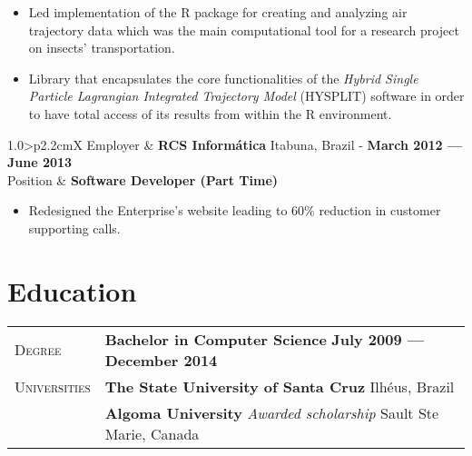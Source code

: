 \documentclass[9pt, a4paper, oneside, final]{scrartcl} %
\newcommand{\gray}{\rowcolor[gray]{.90}} %
\begin{document}
\begin{itemize}\itemsep1.0pt \parskip1.5pt 

\item Led implementation of the R package for creating and analyzing air trajectory data which was the main computational tool for a research project on insects' transportation.

\item Library that encapsulates the core functionalities of the \textit{Hybrid Single Particle Lagrangian Integrated Trajectory Model} (HYSPLIT) software in order to have total access of its results from within the R environment.

\end{itemize}

\begin{center}
\begin{tabularx}{1.0\linewidth}{>{\raggedleft\scshape}p{2.2cm}X}
\gray Employer & \textbf{RCS Informática} \hfill Itabuna, Brazil - \textbf{March 2012 --- June 2013}\\
\gray Position & \textbf{Software Developer (Part Time)}\\
\end{tabularx}
\end{center}

\begin{itemize}\itemsep1.0pt \parskip0pt 

\item Redesigned the Enterprise's website leading to 60\% reduction in customer supporting calls.

\end{itemize}


\section{Education}

\begin{center}
\begin{tabularx}{1.0\linewidth}{>{\raggedleft\scshape}p{2.2cm}X}
\gray Degree & \textbf{Bachelor in Computer Science} \hfill \textbf{July 2009 --- December 2014}\\
\gray Universities & \textbf{The State University of Santa Cruz} \hfill Ilhéus, Brazil\\ 
\gray & \textbf{Algoma University} \textit{Awarded scholarship}  \hfill Sault Ste Marie, Canada\\
\end{tabularx}
\end{center}
\end{document}
